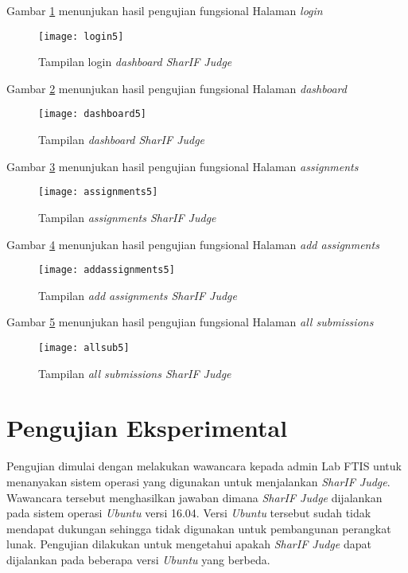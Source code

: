 Gambar \ref{fig:login5} menunjukan hasil pengujian fungsional Halaman \textit{login}
\begin{figure}[H]
	\centering  
	\texttt{[image: login5]}  
	\caption[Tampilan halaman \textit{login SharIF Judge}]{Tampilan login \textit{dashboard SharIF Judge}} 
	\label{fig:login5} 
\end{figure} 

Gambar \ref{fig:dashboard5} menunjukan hasil pengujian fungsional Halaman \textit{dashboard}
\begin{figure}[H]
	\centering  
	\texttt{[image: dashboard5]}  
	\caption[Tampilan halaman \textit{dashboard SharIF Judge}]{Tampilan \textit{dashboard SharIF Judge}} 
	\label{fig:dashboard5} 
\end{figure} 

Gambar \ref{fig:assignments5} menunjukan hasil pengujian fungsional Halaman \textit{assignments}
\begin{figure}[H]
	\centering  
	\texttt{[image: assignments5]}  
	\caption[Tampilan halaman \textit{assignments SharIF Judge}]{Tampilan  \textit{assignments SharIF Judge}} 
	\label{fig:assignments5} 
\end{figure} 

Gambar \ref{fig:addassignments5} menunjukan hasil pengujian fungsional Halaman \textit{add assignments}
\begin{figure}[H]
	\centering  
	\texttt{[image: addassignments5]}  
	\caption[Tampilan halaman \textit{add assignments SharIF Judge}]{Tampilan  \textit{add assignments SharIF Judge}} 
	\label{fig:addassignments5} 
\end{figure} 

Gambar \ref{fig:allsub5} menunjukan hasil pengujian fungsional Halaman \textit{all submissions}
\begin{figure}[H]
	\centering  
	\texttt{[image: allsub5]}  
	\caption[Tampilan halaman \textit{all submissions SharIF Judge}]{Tampilan  \textit{all submissions SharIF Judge}} 
	\label{fig:allsub5} 
\end{figure} 

\section{Pengujian Eksperimental}
Pengujian dimulai dengan melakukan wawancara kepada admin Lab FTIS untuk menanyakan sistem operasi yang digunakan untuk menjalankan \textit{SharIF Judge}. Wawancara tersebut menghasilkan jawaban dimana \textit{SharIF Judge} dijalankan pada sistem operasi \textit{Ubuntu} versi 16.04. Versi \textit{Ubuntu} tersebut sudah tidak mendapat dukungan sehingga tidak digunakan untuk pembangunan perangkat lunak. Pengujian dilakukan untuk mengetahui apakah \textit{SharIF Judge} dapat dijalankan pada beberapa versi \textit{Ubuntu} yang berbeda. 


